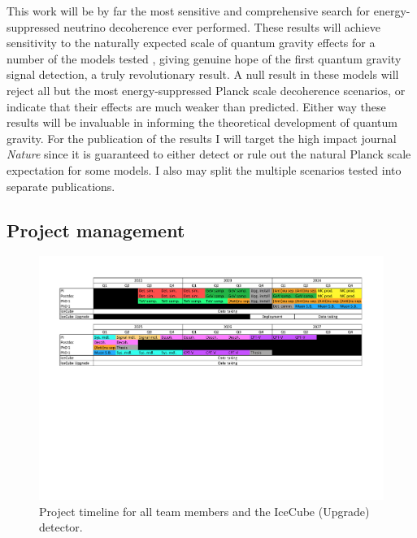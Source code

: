 \documentclass[a4paper,11pt]{article}
\begin{document}

This work will be by far the most sensitive and comprehensive search for energy-suppressed neutrino decoherence ever performed. These results will achieve sensitivity to the naturally expected scale of quantum gravity effects for a number of the models tested , giving genuine hope of the first quantum gravity signal detection, a truly revolutionary result. A null result in these models will reject all but the most energy-suppressed Planck scale decoherence scenarios, or indicate that their effects are much weaker than predicted. Either way these results will be invaluable in informing the theoretical development of quantum gravity. For the publication of the results I will target the high impact journal \textit{Nature} since it is guaranteed to either detect or rule out the natural Planck scale expectation for some models. I also may split the multiple scenarios tested into separate publications. \\




\subsection{Project management}

\begin{figure}[h]
	\includegraphics[trim=1.7cm 11.1cm 1.7cm 1.0cm, clip=true, width=0.99\linewidth]{images/TaskPlanning.pdf}
	\caption{Project timeline for all team members and the IceCube (Upgrade) detector.}
	\label{fig:timeline}
\end{figure}
\end{document}
